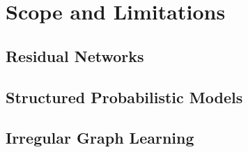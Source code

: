 
\chapter{Scope and Limitations} %
\label{scopeandlim} %



\section{Residual Networks}

\section{Structured Probabilistic Models}

\section{Irregular Graph Learning}





